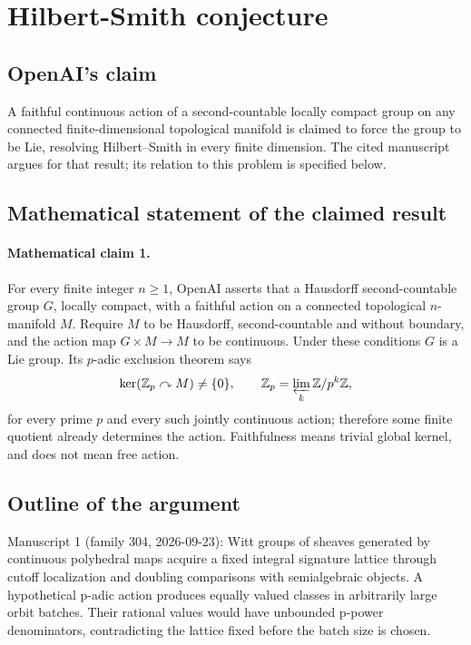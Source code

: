 \documentclass[11pt]{article}
\begin{document}
\section*{Hilbert-Smith conjecture}

\subsection{OpenAI's claim}
A faithful continuous action of a second-countable locally compact group on any connected finite-dimensional topological manifold is claimed to force the group to be Lie, resolving Hilbert--Smith in every finite dimension. The cited manuscript argues for that result; its relation to this problem is specified below.

\subsection{Mathematical statement of the claimed result}
\paragraph{Mathematical claim 1.} For every finite integer $n\ge1$, OpenAI asserts that a Hausdorff second-countable group $G$, locally compact, with a faithful action on a connected topological $n$-manifold $M$. Require $M$ to be Hausdorff, second-countable and without boundary, and the action map $G\times M\to M$ to be continuous. Under these conditions $G$ is a Lie group. Its $p$-adic exclusion theorem says
\[
\ker(\mathbb Z_p\curvearrowright M)\ne\{0\},\qquad
\mathbb Z_p=\varprojlim_k\mathbb Z/p^k\mathbb Z,
\]
for every prime $p$ and every such jointly continuous action; therefore some finite quotient already determines the action. Faithfulness means trivial global kernel, and does not mean free action.

\subsection{Outline of the argument}
Manuscript 1 (family 304, 2026-09-23): Witt groups of sheaves generated by continuous polyhedral maps acquire a fixed integral signature lattice through cutoff localization and doubling comparisons with semialgebraic objects. A hypothetical p-adic action produces equally valued classes in arbitrarily large orbit batches. Their rational values would have unbounded p-power denominators, contradicting the lattice fixed before the batch size is chosen.
\end{document}
